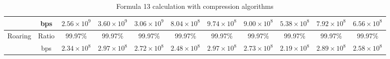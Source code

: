 \begin{table}[h]
{\begin{tabular}{|c|c|c|c|c|c|c|c|c|c|c|}
\cline{2-11}
& bps & $2.56 \times 10^{9}$ & $3.60 \times 10^{9}$ & $3.06 \times 10^{9}$ & $8.04 \times 10^{8}$ & $9.74 \times 10^{8}$ & $9.00 \times 10^{8}$ & $5.38 \times 10^{8}$ & $7.92 \times 10^{8}$ & $6.56 \times 10^{8}$ \\
\hline
\multirow{2}{*}{Roaring} & Ratio & 99.97\% & 99.97\% & 99.97\% & 99.97\% & 99.97\% & 99.97\% & 99.97\% & 99.97\% & 99.97\% \\
\cline{2-11}
& bps & $2.34 \times 10^{8}$ & $2.97 \times 10^{8}$ & $2.72 \times 10^{8}$ & $2.48 \times 10^{8}$ & $2.97 \times 10^{8}$ & $2.73 \times 10^{8}$ & $2.19 \times 10^{8}$ & $2.89 \times 10^{8}$ & $2.58 \times 10^{8}$ \\
\hline
\end{tabular}
}
\caption{Formula 13 calculation with compression algorithms}
\label{tbl:formulacompress13}
\end{table}


